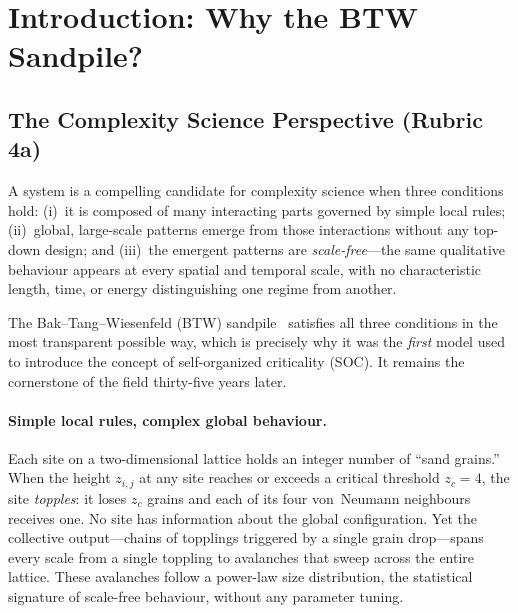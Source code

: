 \documentclass[preprint,12pt]{elsarticle}
\begin{document}
\section{Introduction: Why the BTW Sandpile?}
\label{sec:intro}

\subsection{The Complexity Science Perspective (Rubric 4a)}

A system is a compelling candidate for complexity science when three
conditions hold: (i)~it is composed of many interacting parts governed
by simple local rules; (ii)~global, large-scale patterns emerge from
those interactions without any top-down design; and (iii)~the emergent
patterns are \emph{scale-free}---the same qualitative behaviour appears
at every spatial and temporal scale, with no characteristic length,
time, or energy distinguishing one regime from another.

The Bak--Tang--Wiesenfeld (BTW) sandpile~\cite{Bak1987,Bak1988}
satisfies all three conditions in the most transparent possible way,
which is precisely why it was the \emph{first} model used to introduce
the concept of self-organized criticality (SOC).
It remains the cornerstone of the field thirty-five years later.

\paragraph{Simple local rules, complex global behaviour.}
Each site on a two-dimensional lattice holds an integer number of
``sand grains.''
When the height $z_{i,j}$ at any site reaches or exceeds a critical
threshold $z_c=4$, the site \emph{topples}: it loses $z_c$ grains and
each of its four von~Neumann neighbours receives one.
No site has information about the global configuration.
Yet the collective output---chains of topplings triggered by a single
grain drop---spans every scale from a single toppling to avalanches
that sweep across the entire lattice.
These avalanches follow a power-law size distribution, the statistical
signature of scale-free behaviour, without any parameter tuning.
\end{document}
